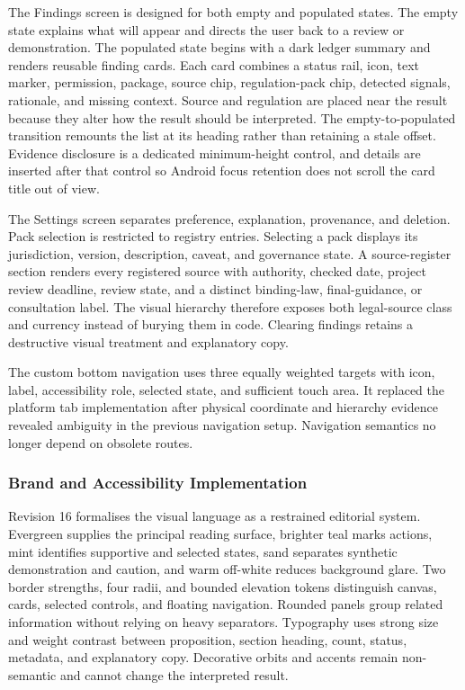 The Findings screen is designed for both empty and populated states. The empty state explains what will appear and directs the user back to a review or demonstration. The populated state begins with a dark ledger summary and renders reusable finding cards. Each card combines a status rail, icon, text marker, permission, package, source chip, regulation-pack chip, detected signals, rationale, and missing context. Source and regulation are placed near the result because they alter how the result should be interpreted. The empty-to-populated transition remounts the list at its heading rather than retaining a stale offset. Evidence disclosure is a dedicated minimum-height control, and details are inserted after that control so Android focus retention does not scroll the card title out of view.

The Settings screen separates preference, explanation, provenance, and deletion. Pack selection is restricted to registry entries. Selecting a pack displays its jurisdiction, version, description, caveat, and governance state. A source-register section renders every registered source with authority, checked date, project review deadline, review state, and a distinct binding-law, final-guidance, or consultation label. The visual hierarchy therefore exposes both legal-source class and currency instead of burying them in code. Clearing findings retains a destructive visual treatment and explanatory copy.

The custom bottom navigation uses three equally weighted targets with icon, label, accessibility role, selected state, and sufficient touch area. It replaced the platform tab implementation after physical coordinate and hierarchy evidence revealed ambiguity in the previous navigation setup. Navigation semantics no longer depend on obsolete routes.

\subsubsection{Brand and Accessibility Implementation}

Revision 16 formalises the visual language as a restrained editorial system. Evergreen supplies the principal reading surface, brighter teal marks actions, mint identifies supportive and selected states, sand separates synthetic demonstration and caution, and warm off-white reduces background glare. Two border strengths, four radii, and bounded elevation tokens distinguish canvas, cards, selected controls, and floating navigation. Rounded panels group related information without relying on heavy separators. Typography uses strong size and weight contrast between proposition, section heading, count, status, metadata, and explanatory copy. Decorative orbits and accents remain non-semantic and cannot change the interpreted result.

